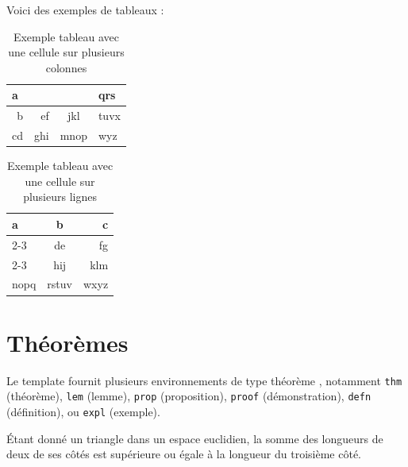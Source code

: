 \documentclass[a4paper, 12pt]{report}
\begin{document}
    Voici des exemples de tableaux :

    \begin{table}[H]
        \centering
        \begin{tabular}{|r|r|c|l|}
            \hline
            \multicolumn{3}{|l|}{a} & qrs  \\ \hline
             b &  ef &     jkl      & tuvx \\ \hline
            cd & ghi &     mnop     & wyz  \\ \hline
        \end{tabular}
        \caption{Exemple tableau avec une cellule sur plusieurs colonnes}
        \label{tab:multicol_example}
    \end{table}

    \begin{table}[H]
        \centering
        \begin{tabular}{|l|c|r|}
            \hline
            \multirow{3}{2cm}{a} &   b   &    c \\ \cline{2-3}
                                 &  de   &   fg \\ \cline{2-3}
                                 &  hij  &  klm \\ \hline
            nopq                 & rstuv & wxyz \\ \hline
        \end{tabular}
        \caption{Exemple tableau avec une cellule sur plusieurs lignes}
        \label{tab:multirow_example}
    \end{table}

    \section{Théorèmes}
    Le template fournit plusieurs environnements de type \og théorème \fg, notamment \verb+thm+ (théorème), \verb+lem+ (lemme), \verb+prop+ (proposition), \verb+proof+ (démonstration), \verb+defn+ (définition), ou \verb+expl+ (exemple).

    \begin{thm}
        Étant donné un triangle dans un espace euclidien, la somme des longueurs de deux de ses côtés est supérieure ou égale à la longueur du troisième côté.
    \end{thm}
\end{document}
